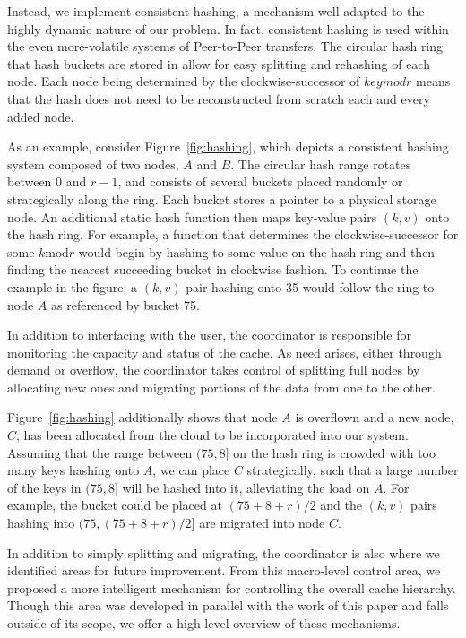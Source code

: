 Instead, we implement consistent hashing\cite{karger1}, a mechanism well
adapted to the highly dynamic nature of our problem. In fact, consistent
hashing is used within the even more-volatile systems of Peer-to-Peer
transfers. The circular hash ring that hash buckets are stored in allow for
easy splitting and rehashing of each node. Each node being determined by the
clockwise-successor of $key mod r$ means that the hash does not need to be
reconstructed from scratch each and every added node.

As an example, consider Figure~\ref{fig:hashing}, which depicts a consistent
hashing system composed of two nodes, $A$ and $B$. The circular hash range
rotates between $0$ and $r-1$, and consists of several buckets placed randomly
or strategically along the ring. Each bucket stores a pointer to a physical
storage node. An additional static hash function then maps key-value pairs
$(k,v)$ onto the hash ring. For example, a function that determines the
clockwise-successor for some $k \textrm{mod} r$ would begin by hashing to some
value on the hash ring and then finding the nearest succeeding bucket in
clockwise fashion. To continue the example in the figure: a $(k,v)$ pair
hashing onto 35 would follow the ring to node $A$ as referenced by bucket 75.

In addition to interfacing with the user, the coordinator is responsible for
monitoring the capacity and status of the cache. As need arises, either through
demand or overflow, the coordinator takes control of splitting full nodes by
allocating new ones and migrating portions of the data from one to the other.

Figure~\ref{fig:hashing} additionally shows that node $A$ is overflown and a
new node, $C$, has been allocated from the cloud to be incorporated into our
system. Assuming that the range between $(75,8]$ on the hash ring is crowded
with too many keys hashing onto $A$, we can place $C$ strategically, such that
a large number of the keys in $(75,8]$ will be hashed into it, alleviating the
load on $A$. For example, the bucket could be placed at $(75 + 8 + r)/2$ and
the $(k,v)$ pairs hashing into $(75, (75 + 8 + r)/2]$ are migrated into node $C$.

In addition to simply splitting and migrating, the coordinator is also where we
identified areas for future improvement\cite{chiu_ijngc11}. From this
macro-level control area, we proposed a more intelligent mechanism for
controlling the overall cache hierarchy. Though this area was developed in
parallel with the work of this paper and falls outside of its scope, we offer a
high level overview of these mechanisms.

